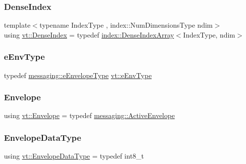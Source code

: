 \mbox{\label{namespacevt_ac016d9c31465ce11c14eab2be11f9183}} 
\subsubsection{\texorpdfstring{Dense\+Index}{DenseIndex}}
{\footnotesize\ttfamily template$<$typename Index\+Type , index\+::\+Num\+Dimensions\+Type ndim$>$ \\
using \hyperlink{namespacevt_ac016d9c31465ce11c14eab2be11f9183}{vt\+::\+Dense\+Index} = typedef \hyperlink{structvt_1_1index_1_1_dense_index_array}{index\+::\+Dense\+Index\+Array}$<$Index\+Type, ndim$>$}

\mbox{\label{namespacevt_abdfe9ac50e3799705ee21853c1509bf6}} 
\subsubsection{\texorpdfstring{e\+Env\+Type}{eEnvType}}
{\footnotesize\ttfamily typedef \hyperlink{namespacevt_1_1messaging_a6508ef3a4701a2e6fd0bfe3edcc63a6c}{messaging\+::e\+Envelope\+Type} \hyperlink{namespacevt_1_1messaging_a6508ef3a4701a2e6fd0bfe3edcc63a6c}{vt\+::e\+Env\+Type}}

\mbox{\label{namespacevt_aa9c8cc094b5361482021d63012987814}} 
\subsubsection{\texorpdfstring{Envelope}{Envelope}}
{\footnotesize\ttfamily using \hyperlink{namespacevt_aa9c8cc094b5361482021d63012987814}{vt\+::\+Envelope} = typedef \hyperlink{structvt_1_1messaging_1_1_active_envelope}{messaging\+::\+Active\+Envelope}}

\mbox{\label{namespacevt_a2740126d59f361d9ba46f66b3b4b0d3d}} 
\subsubsection{\texorpdfstring{Envelope\+Data\+Type}{EnvelopeDataType}}
{\footnotesize\ttfamily using \hyperlink{namespacevt_a2740126d59f361d9ba46f66b3b4b0d3d}{vt\+::\+Envelope\+Data\+Type} = typedef int8\+\_\+t}



